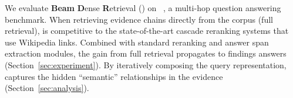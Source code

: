We evaluate \textbf{Beam} \textbf{D}ense \textbf{R}etrieval (\name{}) 
on \hotpot{}~\cite{yang+18b}, a multi-hop question answering benchmark. 
When retrieving evidence chains directly from the corpus (full retrieval), \name{} 
is competitive to the 
state-of-the-art cascade reranking systems that use Wikipedia links. Combined with standard 
reranking and answer span extraction modules,
the gain from full retrieval propagates to findings answers
(Section~\ref{sec:experiment}). 
%
By iteratively composing the query representation, \name{} captures
the hidden ``semantic'' relationships in the evidence
(Section~\ref{sec:analysis}).


